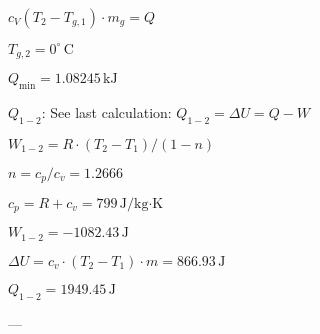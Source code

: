 \( c_V (T_{2} - T_{g,1}) \cdot m_g = Q \)  

\( T_{g,2} = 0^\circ \, \text{C} \)  

\( Q_{\text{min}} = 1.08245 \, \text{kJ} \)

\( Q_{1-2} \):  
See last calculation:  
\( Q_{1-2} = \Delta U = Q - W \)  

\( W_{1-2} = R \cdot (T_2 - T_1) / (1 - n) \)  

\( n = c_p / c_v = 1.2666 \)  

\( c_p = R + c_v = 799 \, \text{J/kg·K} \)  

\( W_{1-2} = -1082.43 \, \text{J} \)  

\( \Delta U = c_v \cdot (T_2 - T_1) \cdot m = 866.93 \, \text{J} \)  

\( Q_{1-2} = 1949.45 \, \text{J} \)  

---